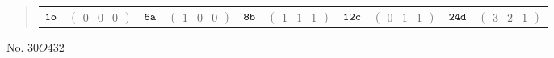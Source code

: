 \documentclass[fleqn,9pt,landscape]{jsarticle}
\begin{document}
\begin{quote}
\begin{tabular}{cccccccccc}
$ {\tt 1o} $ & $ \begin{pmatrix} 0 & 0 & 0 \end{pmatrix} $ & $ {\tt 6a} $ & $ \begin{pmatrix} 1 & 0 & 0 \end{pmatrix} $ & $ {\tt 8b} $ & $ \begin{pmatrix} 1 & 1 & 1 \end{pmatrix} $ & $ {\tt 12c} $ & $ \begin{pmatrix} 0 & 1 & 1 \end{pmatrix} $ & $ {\tt 24d} $ & $ \begin{pmatrix} 3 & 2 & 1 \end{pmatrix} $
\end{tabular}
\end{quote}
\newpage
No. 30\quad$O$\quad$432$\quad[ cubic ]
\end{document}
